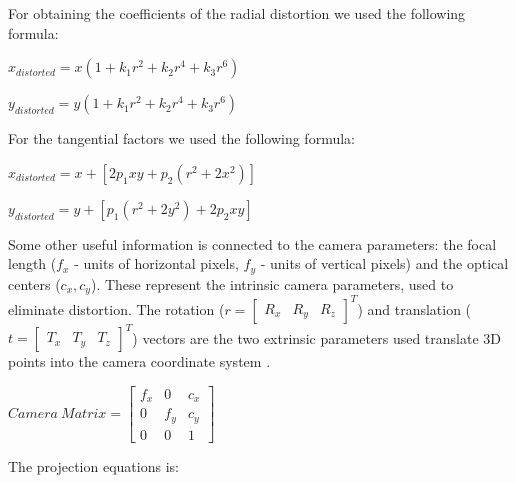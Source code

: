 \documentclass[conference]{IEEEtran}
\begin{document}
For obtaining the coefficients of the radial distortion we used the following formula:

\begin{center}
\begin{math} 
x_{distorted} = x(1 + k_1r^2 + k_2r^4+ k_3r^6) 
\end{math} 

\begin{math}
y_{distorted} = y(1 + k_1r^2 + k_2r^4+ k_3r^6)
\end{math} 
\end{center}

For the tangential factors we used the following formula: 
\begin{center}
\begin{math} 
 x_{distorted} = x + [2p_1xy + p_2(r^2 + 2x^2)]
\end{math} 

\begin{math}
y_{distorted} = y + [p_1(r^2 + 2y^2) + 2p_2xy]
\end{math}
\end{center}
Some other useful information is connected to the camera parameters: the focal length ($f_x$ - units of horizontal pixels, $f_y$ - units of vertical pixels) and the optical centers ($c_x, c_y$). These represent the intrinsic camera parameters, used to eliminate distortion. The rotation (\begin{math} 
r = 
\begin{bmatrix}
R_x & R_y & R_z
\end{bmatrix}^T\end{math}) and translation (\begin{math} 
t = 
\begin{bmatrix}
T_x & T_y & T_z
\end{bmatrix}^T\end{math}) vectors are the two extrinsic parameters used translate 3D points into the camera coordinate system \cite{slidesNedevschi}. 
\begin{center}
\begin{math} 
Camera\ Matrix = 
 \begin{bmatrix}
f_x & 0 & c_x\\
0 & f_y & c_y\\
0 & 0 & 1
\end{bmatrix}
\end{math} 
\end{center}
The projection equations is: 
\end{document}
